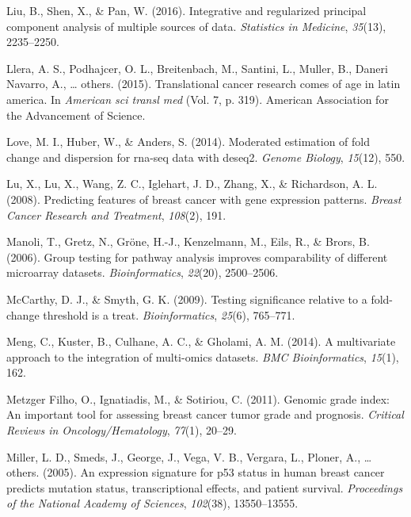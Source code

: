 \documentclass[12pt,twoside]{reedthesis}
\begin{document}
\leavevmode\hypertarget{ref-liu2016integrative}{}%
Liu, B., Shen, X., \& Pan, W. (2016). Integrative and regularized principal component analysis of multiple sources of data. \emph{Statistics in Medicine}, \emph{35}(13), 2235--2250.

\leavevmode\hypertarget{ref-llera2015translational}{}%
Llera, A. S., Podhajcer, O. L., Breitenbach, M., Santini, L., Muller, B., Daneri Navarro, A., \ldots{} others. (2015). Translational cancer research comes of age in latin america. In \emph{American sci transl med} (Vol. 7, p. 319). American Association for the Advancement of Science.

\leavevmode\hypertarget{ref-love2014moderated}{}%
Love, M. I., Huber, W., \& Anders, S. (2014). Moderated estimation of fold change and dispersion for rna-seq data with deseq2. \emph{Genome Biology}, \emph{15}(12), 550.

\leavevmode\hypertarget{ref-lu2008predicting}{}%
Lu, X., Lu, X., Wang, Z. C., Iglehart, J. D., Zhang, X., \& Richardson, A. L. (2008). Predicting features of breast cancer with gene expression patterns. \emph{Breast Cancer Research and Treatment}, \emph{108}(2), 191.

\leavevmode\hypertarget{ref-manoli2006group}{}%
Manoli, T., Gretz, N., Gröne, H.-J., Kenzelmann, M., Eils, R., \& Brors, B. (2006). Group testing for pathway analysis improves comparability of different microarray datasets. \emph{Bioinformatics}, \emph{22}(20), 2500--2506.

\leavevmode\hypertarget{ref-mccarthy2009testing}{}%
McCarthy, D. J., \& Smyth, G. K. (2009). Testing significance relative to a fold-change threshold is a treat. \emph{Bioinformatics}, \emph{25}(6), 765--771.

\leavevmode\hypertarget{ref-meng2014multivariate}{}%
Meng, C., Kuster, B., Culhane, A. C., \& Gholami, A. M. (2014). A multivariate approach to the integration of multi-omics datasets. \emph{BMC Bioinformatics}, \emph{15}(1), 162.

\leavevmode\hypertarget{ref-metzger2011genomic}{}%
Metzger Filho, O., Ignatiadis, M., \& Sotiriou, C. (2011). Genomic grade index: An important tool for assessing breast cancer tumor grade and prognosis. \emph{Critical Reviews in Oncology/Hematology}, \emph{77}(1), 20--29.

\leavevmode\hypertarget{ref-miller2005expression}{}%
Miller, L. D., Smeds, J., George, J., Vega, V. B., Vergara, L., Ploner, A., \ldots{} others. (2005). An expression signature for p53 status in human breast cancer predicts mutation status, transcriptional effects, and patient survival. \emph{Proceedings of the National Academy of Sciences}, \emph{102}(38), 13550--13555.
\end{document}
